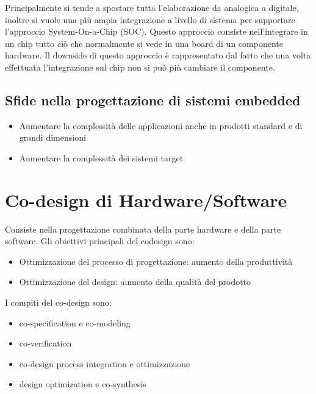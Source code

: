 \documentclass[a4paper]{article}
\begin{document}
		\noindent
		Principalmente si tende a spostare tutta l'elaborazione da analogica a digitale, inoltre si vuole una più ampia integrazione a livello di sistema per supportare l'approccio System-On-a-Chip (SOC). Questo approccio consiste nell'integrare in un chip tutto ciò che normalmente si vede in una board di un componente hardware. Il downside di questo approccio è rappresentato dal fatto che una volta effettuata l'integrazione sul chip non si può più cambiare il componente.
		 
	
	\subsection{Sfide nella progettazione di sistemi embedded}
		\begin{itemize}
			\item Aumentare la complessità delle applicazioni anche in prodotti standard e di grandi dimensioni
			\item Aumentare la complessità dei sistemi target
		\end{itemize}
		
	\section{Co-design di Hardware/Software }
		Consiste nella progettazione combinata della parte hardware e della parte software.
		Gli obiettivi principali del codesign sono:
		\begin{itemize}
			\item Ottimizzazione del processo di progettazione: aumento della produttività
			\item Ottimizzazione del design: aumento della qualità del prodotto
		\end{itemize}
		
		\begin{center}
		\end{center}
		\bigskip
		
		\noindent
		I compiti del co-design sono:
		\begin{itemize}
			\item co-specification e co-modeling
			\item co-verification
			\item co-design process integration e ottimizzazione
			\item design optimization e co-synthesis
		\end{itemize}
	
\end{document}
